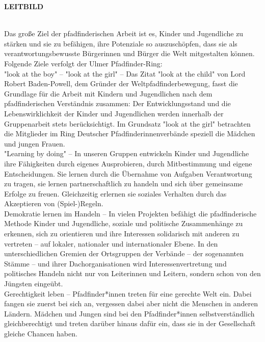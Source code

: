 \begin{Large}
    \textbf{LEITBILD}
\end{Large}
\\

Das große Ziel der pfadfinderischen Arbeit ist es, Kinder und Jugendliche zu stärken und sie zu 
befähigen, ihre Potenziale so auszuschöpfen, dass sie als verantwortungsbewusste Bürgerinnen und 
Bürger die Welt mitgestalten können. Folgende Ziele verfolgt der Ulmer Pfadfinder-Ring:
\\

"look at the boy" – "look at the girl" – Das Zitat "look at the child" von Lord Robert Baden-Powell, 
dem Gründer der Weltpfadfinderbewegung, fasst die Grundlage für die Arbeit mit Kindern und 
Jugendlichen nach dem pfadfinderischen Verständnis zusammen: Der Entwicklungsstand und die 
Lebenswirklichkeit der Kinder und Jugendlichen werden innerhalb der Gruppenarbeit stets 
berücksichtigt. Im Grundsatz "look at the girl" betrachten die Mitglieder im Ring Deutscher 
Pfadfinderinnenverbände speziell die Mädchen und jungen Frauen.
\\

"Learning by doing" – In unseren Gruppen entwickeln Kinder und Jugendliche ihre Fähigkeiten durch 
eigenes Ausprobieren, durch Mitbestimmung und eigene Entscheidungen. Sie lernen durch die Übernahme 
von Aufgaben Verantwortung zu tragen, sie lernen partnerschaftlich zu handeln und sich über 
gemeinsame Erfolge zu freuen. Gleichzeitig erlernen sie soziales Verhalten durch das Akzeptieren 
von (Spiel-)Regeln.
\\

Demokratie lernen im Handeln – In vielen Projekten befähigt die pfadfinderische Methode Kinder und 
Jugendliche, soziale und politische Zusammenhänge zu erkennen, sich zu orientieren und ihre 
Interessen solidarisch mit anderen zu vertreten – auf lokaler, nationaler und internationaler Ebene. 
In den unterschiedlichen Gremien der Ortsgruppen der Verbände – der sogenannten Stämme – und ihrer 
Dachorganisationen wird Interessenvertretung und politisches Handeln nicht nur von Leiterinnen und 
Leitern, sondern schon von den Jüngsten eingeübt.
\\

Gerechtigkeit leben – Pfadfinder*innen treten für eine gerechte Welt ein. Dabei fangen sie zuerst 
bei sich an, vergessen dabei aber nicht die Menschen in anderen Ländern. Mädchen und Jungen sind bei 
den Pfadfinder*innen selbstverständlich gleichberechtigt und treten darüber hinaus dafür ein, dass 
sie in der Gesellschaft gleiche Chancen haben.
\\

